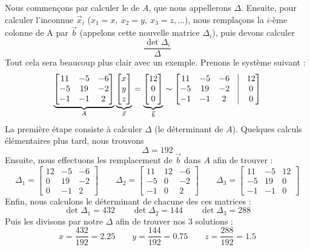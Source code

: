\documentclass[12pt,a4paper]{article}
\begin{document}
Nous commençons par calculer le  de $A$, que nous appellerons $\Delta$. Ensuite, pour calculer l'inconnue $\vec{x}_i$ ($x_1 = x,\ x_2 = y,\ x_3 = z,\ldots$), nous remplaçons la $i$-ème colonne de A par $\vec{b}$ (appelons cette nouvelle matrice $\Delta_i$), puis devons calculer 
\[\frac{\det \Delta_i}{\Delta}\]
Tout cela sera beaucoup plus clair avec un exemple. Prenons le système suivant :
\[
\underbrace{\begin{bmatrix}
	11 & -5 & -6 \\
	-5 & 19 & -2\\
	-1 & -1 & 2 
\end{bmatrix}}_A
\underbrace{\begin{bmatrix}
	x\\
	y\\
	z
\end{bmatrix}}_{\vec{x}}
=
\underbrace{\begin{bmatrix}
	12\\
	0\\
	0
\end{bmatrix}}_{\vec{b}}
\sim
\begin{bmatrix}
	11 & -5 & -6 & \vline &12\\
	-5 & 19 & -2 &\vline  &0\\
	-1 & -1 & 2 & \vline & 0
\end{bmatrix}\]
La première étape consiste à calculer $\Delta$ (le déterminant de $A$). Quelques calculs élémentaires plus tard, nous trouvons 
\[\Delta = 192\]
Ensuite, nous effectuons les remplacement de $\vec{b}$ dans $A$ afin de trouver :
\[\Delta_1 = \begin{bmatrix}
	12 & -5 & -6 \\
	0 & 19 & -2\\
	0 & -1 & 2 
\end{bmatrix} \qquad \Delta_2 = \begin{bmatrix}
	11 & 12 & -6 \\
	-5 & 0 & -2\\
	-1 & 0 & 2 
\end{bmatrix} \qquad \Delta_3 = \begin{bmatrix}
	11 & -5 & 12 \\
	-5 & 19 & 0\\
	-1 & -1 & 0 
\end{bmatrix}
\] 
Enfin, nous calculons le déterminant de chacune des ces matrices :
\[\det \Delta_1 = 432 \qquad \det \Delta_2 = 144 \qquad \det \Delta_3 = 288\]
Puis les divisons par notre $\Delta$ afin de trouver nos 3 solutions :
\[x = \frac{432}{192} = 2.25 \qquad y = \frac{144}{192} = 0.75 \qquad z = \frac{288}{192} = 1.5\]
\end{document}
